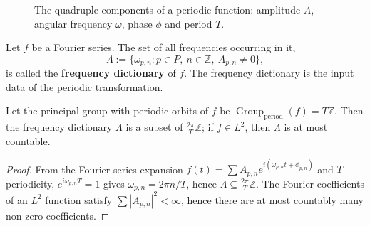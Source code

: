 \begin{figure}[htbp]
\centering
{}
\caption{The quadruple components of a periodic function: amplitude $A$, angular frequency $\omega$, phase $\phi$ and period $T$.}
\label{fig:period_quadruple}
\end{figure}

\begin{definition}\label{def:frequency_dictionary}
Let $f$ be a Fourier series. The set of all frequencies occurring in it,
\[
\Lambda := \{\omega_{p,n} : p\in P,\ n\in\mathbb{Z},\ A_{p,n}\neq 0\},
\]
is called the \textbf{frequency dictionary} of $f$. The frequency dictionary is the input data of the periodic transformation.
\end{definition}

\begin{property}\label{prop:frequency_dictionary_structure}
Let the principal group with periodic orbits of $f$ be $\operatorname{Group}_{\mathrm{period}}(f)=T\mathbb{Z}$. Then the frequency dictionary $\Lambda$ is a subset of $\frac{2\pi}{T}\mathbb{Z}$; if $f\in L^2$, then $\Lambda$ is at most countable.
\end{property}

\begin{proof}
From the Fourier series expansion $f(t)=\sum A_{p,n}e^{i(\omega_{p,n}t+\phi_{p,n})}$ and $T$-periodicity, $e^{i\omega_{p,n}T}=1$ gives $\omega_{p,n}=2\pi n/T$, hence $\Lambda\subseteq\frac{2\pi}{T}\mathbb{Z}$. The Fourier coefficients of an $L^2$ function satisfy $\sum|A_{p,n}|^2<\infty$, hence there are at most countably many non-zero coefficients.
\end{proof}

